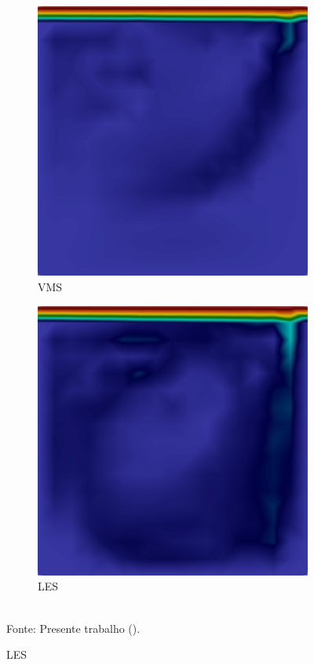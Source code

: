 \begin{figure}[h!]
\begin{subfigure}{0.32\textwidth}
        \includegraphics[width=\linewidth]{Figuras/cavity3D/VMS.png}
        \caption{VMS}
    \end{subfigure}
    \begin{subfigure}{0.32\textwidth}
        \centering
        \includegraphics[width=\linewidth]{Figuras/cavity3D/LES.png}
        \caption{LES}
    \end{subfigure}
    \\Fonte: Presente trabalho (\the\year).
    \label{fig:cavity-results5}
\end{figure}

